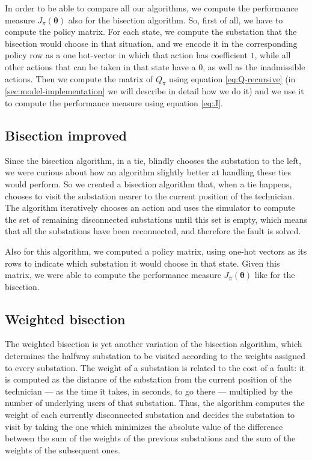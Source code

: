 In order to be able to compare all our algorithms, we compute the performance measure $J_\pi(\boldsymbol \theta)$ also for the bisection algorithm. So, first of all, we have to compute the policy matrix. For each state, we compute the substation that the bisection would choose in that situation, and we encode it in the corresponding policy row as a one hot-vector in which that action has coefficient $1$, while all other actions that can be taken in that state have a $0$, as well as the inadmissible actions. Then we compute the matrix of $Q_\pi$ using equation \eqref{eq:Q-recursive} (in \autoref{sec:model-implementation} we will describe in detail how we do it) and we use it to compute the performance measure using equation \eqref{eq:J}.


\subsection{Bisection improved}

Since the bisection algorithm, in a tie, blindly chooses the substation to the left, we were curious about how an algorithm slightly better at handling these ties would perform. So we created a bisection algorithm that, when a tie happens, chooses to visit the substation nearer to the current position of the technician. The algorithm iteratively chooses an action and uses the simulator to compute the set of remaining disconnected substations until this set is empty, which means that all the substations have been reconnected, and therefore the fault is solved.

Also for this algorithm, we computed a policy matrix, using one-hot vectors as its rows to indicate which substation it would choose in that state. Given this matrix, we were able to compute the performance measure $J_\pi(\boldsymbol \theta)$ like for the bisection.


\subsection{Weighted bisection}

The weighted bisection is yet another variation of the bisection algorithm, which determines the halfway substation to be visited according to the weights assigned to every substation. The weight of a substation is related to the cost of a fault: it is computed as the distance of the substation from the current position of the technician --- as the time it takes, in seconds, to go there --- multiplied by the number of underlying users of that substation. Thus, the algorithm computes the weight of each currently disconnected substation and decides the substation to visit by taking the one which minimizes the absolute value of the difference between the sum of the weights of the previous substations and the sum of the weights of the subsequent ones.

